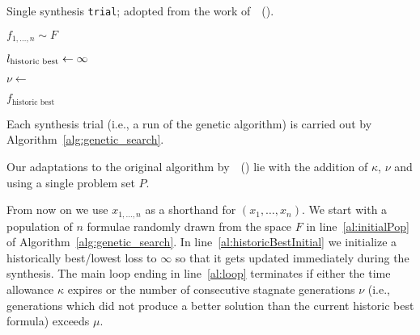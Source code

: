 \documentclass[letterpaper]{article} %
\newcommand{\citea}[1]{\citeauthor{#1}~(\citeyear{#1})}
\begin{document}
\begin{algorithm}[t]
\DontPrintSemicolon
\caption{Single synthesis {\tt trial}; adopted from the work of~\citea{bulitko222portability}.}
\label{alg:genetic_search}
{\footnotesize
{}

$ f_{1,\dots,n} \sim F $ \; \label{al:initialPop}

$l_\text{\rm historic best} \gets \infty$ \; \label{al:historicBestInitial}

$ \nu \gets  $ \; \label{al:numStagInit}

  \label{al:loop}

\Return $ f_\text{historic best} $ \; \label{al:return_best}
}
\end{algorithm}

Each synthesis trial (i.e., a run of the genetic algorithm) is carried out by Algorithm~\ref{alg:genetic_search}.

Our adaptations to the original algorithm by~\citea{bulitko222portability} lie with the addition of $ \kappa $, $ \nu $ and using a single problem set $ P $.

From now on we use $ x_{1, \dots, n} $ as a shorthand for $ (x_1, \dots, x_n) $. We start with a population of $ n $ formulae randomly drawn from the space $ F $ in line~\ref{al:initialPop} of Algorithm~\ref{alg:genetic_search}. In line~\ref{al:historicBestInitial} we initialize a historically best/lowest loss to $ \infty $ so that it gets updated immediately during the synthesis. The main loop ending in line~\ref{al:loop} terminates if either the time allowance $ \kappa $ expires or the number of consecutive stagnate generations $ \nu $ (i.e., generations which did not produce a better solution than the current historic best formula) exceeds $ \mu $.
\end{document}
